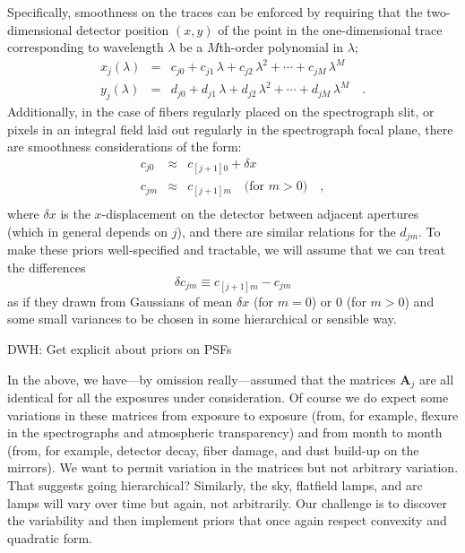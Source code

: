 \documentclass[12pt]{article}
\newcommand{\hmatrix}[1]{\boldsymbol{#1}}
\newcommand{\Amatrix}{\hmatrix{A}}
\begin{document}
Specifically, smoothness on the traces can be enforced by requiring
that the two-dimensional detector position $(x,y)$ of the point in the
one-dimensional trace corresponding to wavelength $\lambda$ be a
$M$th-order polynomial in $\lambda$;
\begin{eqnarray}\displaystyle
x_j(\lambda) & = & c_{j0} + c_{j1}\,\lambda + c_{j2}\,\lambda^2 + \cdots + c_{jM}\,\lambda^M \\
y_j(\lambda) & = & d_{j0} + d_{j1}\,\lambda + d_{j2}\,\lambda^2 + \cdots + d_{j
M}\,\lambda^M \quad .
\end{eqnarray}
Additionally, in the case of fibers regularly placed on the
spectrograph slit, or pixels in an integral field laid out regularly
in the spectrograph focal plane, there are smoothness considerations
of the form:
\begin{eqnarray}\displaystyle
c_{j0} & \approx & c_{[j+1]0} + \delta x \\
c_{jm} & \approx & c_{[j+1]m} \quad \mbox{(for $m > 0$)} \quad ,\\
\end{eqnarray}
where $\delta x$ is the $x$-displacement on the detector between
adjacent apertures (which in general depends on $j$), and there are
similar relations for the $d_{jm}$.  To make these priors
well-specified and tractable, we will assume that we can treat the
differences
\begin{equation}
\delta c_{jm} \equiv c_{[j+1]m} - c_{jm}
\end{equation}
as if they drawn from Gaussians of mean $\delta x$ (for $m=0$) or $0$
(for $m>0$) and some small variances to be chosen in some hierarchical
or sensible way.

DWH: Get explicit about priors on PSFs

In the above, we have---by omission really---assumed that the matrices
$\Amatrix_j$ are all identical for all the exposures under
consideration.  Of course we do expect some variations in these
matrices from exposure to exposure (from, for example, flexure in the
spectrographs and atmospheric transparency) and from month to month
(from, for example, detector decay, fiber damage, and dust build-up on
the mirrors).  We want to permit variation in the matrices but not
arbitrary variation.  That suggests going hierarchical?  Similarly,
the sky, flatfield lamps, and arc lamps will vary over time but again,
not arbitrarily.  Our challenge is to discover the variability and
then implement priors that once again respect convexity and quadratic
form.
\end{document}
